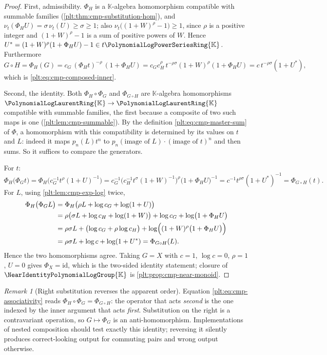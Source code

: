\documentclass[11pt,oneside]{article}
\theoremstyle{plain}
\theoremstyle{definition}
\theoremstyle{remark}
\newtheorem{remark}[theorem]{Remark}
\newcommand{\K}{\mathbb{K}}
\newcommand{\PLpow}{\PolynomialLogPowerSeriesRing{\K}}   %
\newcommand{\PLlau}{\PolynomialLogLaurentRing{\K}}       %
\newcommand{\Gnear}{\NearIdentityPolynomialLogGroup{\K}} %
\newcommand{\ordt}{\nu_{t}}                              %
\newcommand{\compose}{\mathbin{\circ}}
\begin{document}
\begin{proof}
First, admissibility.  \(\Phi_{H}\) is a \(\K\)-algebra homomorphism
compatible with summable families
(\cref{plt:thm:cmp-substitution-hom}), and
\(\ordt(\Phi_{H}U)=\sigma\,\ordt(U)\ge\sigma\ge1\); also
\(\ordt\bigl((1+W)^{\rho}-1\bigr)\ge1\), since \(\rho\) is a positive integer
and \((1+W)^{\rho}-1\) is a sum of positive powers of \(W\).  Hence
\(U^{\ast}=(1+W)^{\rho}(1+\Phi_HU)-1\in t\PLpow\).  Furthermore
\[
 G\compose H
 =\Phi_{H}(G)
 =c_{G}\,(\Phi_{H}t)^{-\rho}\,(1+\Phi_{H}U)
 =c_{G}c_{H}^{\rho}\,t^{-\rho\sigma}(1+W)^{\rho}(1+\Phi_{H}U)
 =c\,t^{-\rho\sigma}(1+U^{\ast}),
\]
which is \eqref{plt:eq:cmp-composed-inner}.

Second, the identity.  Both \(\Phi_{H}\circ\Phi_{G}\) and
\(\Phi_{G\compose H}\) are \(\K\)-algebra homomorphisms
\(\PLlau\to\PLlau\) compatible with summable families, the first
because a composite of two such maps is one
(\cref{plt:lem:cmp-summable}).  By the definition
\eqref{plt:eq:cmp-master-sum} of \(\Phi\), a homomorphism with this
compatibility is determined by its values on \(t\) and \(L\): indeed it maps
\(p_n(L)t^n\) to \(p_n(\text{image of }L)\cdot(\text{image of }t)^{n}\) and
then sums.  So it suffices to compare the generators.

For \(t\):
\[
 \Phi_{H}\bigl(\Phi_{G}t\bigr)
 =\Phi_{H}\bigl(c_{G}^{-1}t^{\rho}(1+U)^{-1}\bigr)
 =c_{G}^{-1}\bigl(c_{H}^{-1}t^{\sigma}(1+W)^{-1}\bigr)^{\rho}
   \bigl(1+\Phi_{H}U\bigr)^{-1}
 =c^{-1}t^{\rho\sigma}(1+U^{\ast})^{-1}
 =\Phi_{G\compose H}(t).
\]
For \(L\), using \cref{plt:lem:cmp-exp-log} twice,
\begin{align*}
 \Phi_{H}\bigl(\Phi_{G}L\bigr)
 &=\Phi_{H}\bigl(\rho L+\log c_{G}+\log(1+U)\bigr)\\
 &=\rho\bigl(\sigma L+\log c_{H}+\log(1+W)\bigr)+\log c_{G}
   +\log\bigl(1+\Phi_{H}U\bigr)\\
 &=\rho\sigma L+\bigl(\log c_{G}+\rho\log c_{H}\bigr)
   +\log\Bigl((1+W)^{\rho}\bigl(1+\Phi_{H}U\bigr)\Bigr)\\
 &=\rho\sigma L+\log c+\log(1+U^{\ast})
 =\Phi_{G\compose H}(L).
\end{align*}
Hence the two homomorphisms agree.  Taking \(G=X\) with \(c=1\),
\(\log c=0\), \(\rho=1\), \(U=0\) gives \(\Phi_{X}=\mathrm{id}\), which is the
two-sided identity statement; closure of \(\Gnear\) is
\cref{plt:prop:cmp-near-monoid}.
\end{proof}

\begin{remark}[Right substitution reverses the apparent order]
\label{plt:rmk:cmp-order-reversal}
Equation \eqref{plt:eq:cmp-associativity} reads
\(\Phi_{H}\circ\Phi_{G}=\Phi_{G\compose H}\): the operator that acts
\emph{second} is the one indexed by the inner argument that acts
\emph{first}.  Substitution on the right is a contravariant operation, so
\(G\mapsto\Phi_{G}\) is an anti-homomorphism.  Implementations of nested
composition should test exactly this identity; reversing it silently produces
correct-looking output for commuting pairs and wrong output otherwise.
\end{remark}
\end{document}
